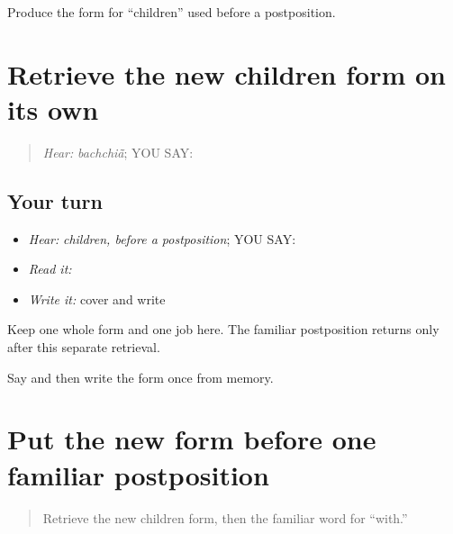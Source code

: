\begin{tcolorbox}[breakable,colback=teal!4,colframe=teal!35!black,title={Before you move on}]
Produce the form for “children” used before a postposition.
\end{tcolorbox}
\section[\texorpdfstring{\pa{ਬੱਚਿਆਂ} (bachchiaan)}{ਬੱਚਿਆਂ (bachchiaan)}]{Retrieve the new children form on its own}

\label{lesson:PA-C204-bachchian-review}



\begin{quote}
\emph{Hear:} \emph{bachchiā̃}; YOU SAY: \textbf{}
\end{quote}

\subsection*{Your turn}
\begin{itemize}
\raggedright
  \item \emph{Hear:} \emph{children, before a postposition}; YOU SAY: \textbf{}
  \item \emph{Read it:} \textbf{}
  \item \emph{Write it:} cover and write \textbf{}
\end{itemize}

\begin{grammarlens}[title={Grammar Lens}]
Keep one whole form and one job here. The familiar postposition returns only after this separate retrieval.
\end{grammarlens}

\begin{tcolorbox}[breakable,colback=teal!4,colframe=teal!35!black,title={Before you move on}]
Say and then write the form once from memory.
\end{tcolorbox}
\section[\texorpdfstring{\pa{ਬੱਚਿਆਂ} \pa{ਨਾਲ} (bachchiaan naal)}{ਬੱਚਿਆਂ ਨਾਲ (bachchiaan naal)}]{Put the new form before one familiar postposition}

\label{lesson:PA-C204-with-children}



\begin{quote}
Retrieve the new children form, then the familiar word for “with.”
\end{quote}

